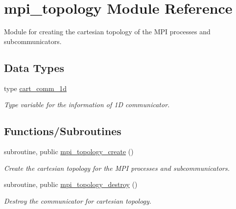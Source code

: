 \hypertarget{namespacempi__topology}{}\section{mpi\+\_\+topology Module Reference}
\label{namespacempi__topology}


Module for creating the cartesian topology of the M\+PI processes and subcommunicators.  


\subsection*{Data Types}
\begin{DoxyCompactItemize}
\item 
type \hyperlink{structmpi__topology_1_1cart__comm__1d}{cart\+\_\+comm\+\_\+1d}
\begin{DoxyCompactList}\small\item\em Type variable for the information of 1D communicator. \end{DoxyCompactList}\end{DoxyCompactItemize}
\subsection*{Functions/\+Subroutines}
\begin{DoxyCompactItemize}
\item 
\mbox{\label{namespacempi__topology_ae299dc83f2e6767402df3dfacfad4e44}} 
subroutine, public \hyperlink{namespacempi__topology_ae299dc83f2e6767402df3dfacfad4e44}{mpi\+\_\+topology\+\_\+create} ()
\begin{DoxyCompactList}\small\item\em Create the cartesian topology for the M\+PI processes and subcommunicators. \end{DoxyCompactList}\item 
\mbox{\label{namespacempi__topology_a27582d0f86406910fa43ad925ac38801}} 
subroutine, public \hyperlink{namespacempi__topology_a27582d0f86406910fa43ad925ac38801}{mpi\+\_\+topology\+\_\+destroy} ()
\begin{DoxyCompactList}\small\item\em Destroy the communicator for cartesian topology. \end{DoxyCompactList}\end{DoxyCompactItemize}
